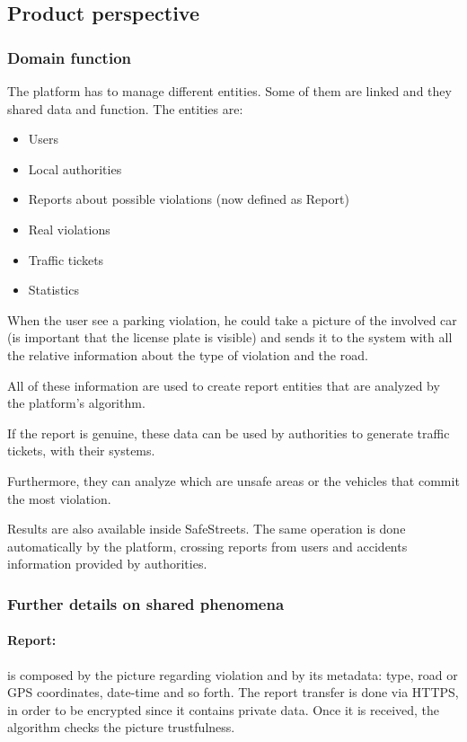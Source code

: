 \subsection{Product perspective}

\subsubsection{Domain function}

The platform has to manage different entities. Some of them are linked and they shared data and function.
The entities are: 
\begin{itemize}
\item Users
\item Local authorities
\item Reports about possible violations (now defined as Report)
\item Real violations
\item Traffic tickets
\item Statistics
\end{itemize}

When the user see a parking violation, he could take a picture of the involved car (is important that the license plate is visible) and sends it to the system with all the relative information about the type of violation and the road.

All of these information are used to create report entities that are analyzed by the platform’s algorithm.

If the report is genuine, these data can be used by authorities to generate traffic tickets, with their systems.

Furthermore, they can analyze which are unsafe areas or the vehicles that commit the most violation.

Results are also available inside SafeStreets.
The same operation is done automatically by the platform, crossing reports from users and accidents information provided by authorities.

\subsubsection{Further details on shared phenomena}

\paragraph{Report:}
is composed by the picture regarding violation and by its metadata: type, road or GPS coordinates, date-time and so forth.
The report transfer is done via HTTPS, in order to be encrypted since it contains private data.
Once it is received, the algorithm checks the picture trustfulness.

